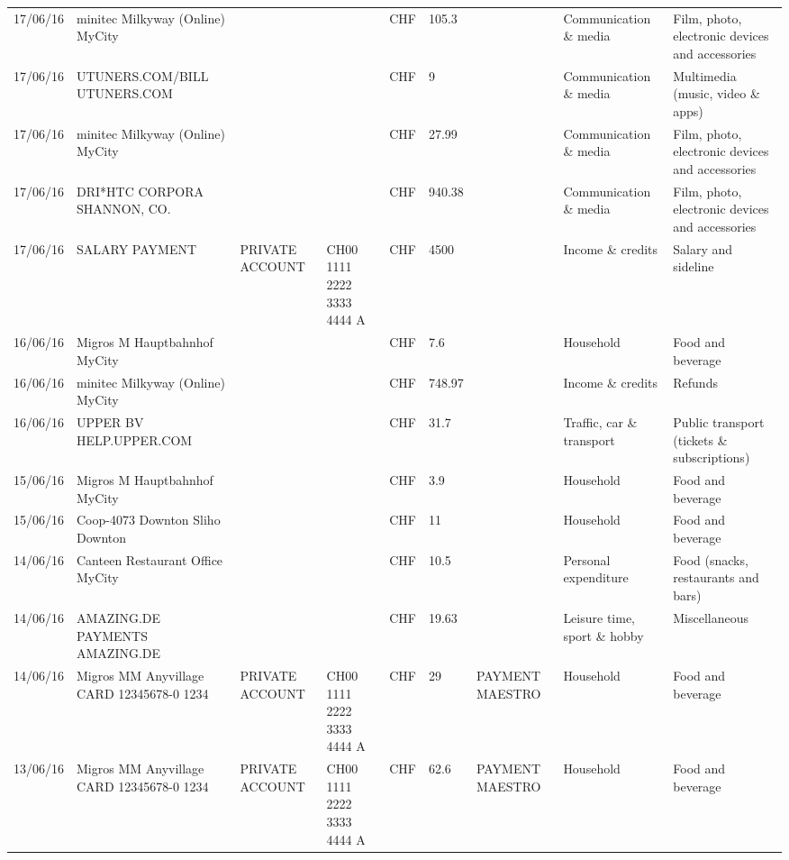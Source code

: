 \begin{landscape}
\begin{adjustwidth}{-2cm}{-2cm}
\begin{tiny}
\begin{longtable}{lp{4cm}llllp{3cm}ll}
		17/06/16 & minitec Milkyway (Online) MyCity &       &       & CHF   & 105.3 &       & Communication \& media & Film, photo, electronic devices and accessories \\
		17/06/16 & UTUNERS.COM/BILL          UTUNERS.COM &       &       & CHF   & 9     &       & Communication \& media & Multimedia (music, video \& apps) \\
		17/06/16 & minitec Milkyway (Online) MyCity &       &       & CHF   & 27.99 &       & Communication \& media & Film, photo, electronic devices and accessories \\
		17/06/16 & DRI*HTC CORPORA          SHANNON, CO. &       &       & CHF   & 940.38 &       & Communication \& media & Film, photo, electronic devices and accessories \\
		17/06/16 & SALARY PAYMENT & PRIVATE ACCOUNT & CH00 1111 2222 3333 4444 A & CHF   & 4500  &       & Income \& credits & Salary and sideline \\
		16/06/16 & Migros M Hauptbahnhof    MyCity &       &       & CHF   & 7.6   &       & Household & Food and beverage \\
		16/06/16 & minitec Milkyway (Online) MyCity &       &       & CHF   & 748.97 &       & Income \& credits & Refunds \\
		16/06/16 & UPPER BV                  HELP.UPPER.COM &       &       & CHF   & 31.7  &       & Traffic, car \& transport & Public transport (tickets \& subscriptions) \\
		15/06/16 & Migros M Hauptbahnhof    MyCity &       &       & CHF   & 3.9   &       & Household & Food and beverage \\
		15/06/16 & Coop-4073 Downton Sliho   Downton &       &       & CHF   & 11    &       & Household & Food and beverage \\
		14/06/16 & Canteen Restaurant Office      MyCity &       &       & CHF   & 10.5  &       & Personal expenditure & Food (snacks, restaurants and bars) \\
		14/06/16 & AMAZING.DE PAYMENTS       AMAZING.DE &       &       & CHF   & 19.63 &       & Leisure time, sport \& hobby & Miscellaneous \\
		14/06/16 & Migros MM Anyvillage CARD 12345678-0 1234 & PRIVATE ACCOUNT & CH00 1111 2222 3333 4444 A & CHF   & 29    & PAYMENT MAESTRO & Household & Food and beverage \\
		13/06/16 & Migros MM Anyvillage CARD 12345678-0 1234 & PRIVATE ACCOUNT & CH00 1111 2222 3333 4444 A & CHF   & 62.6  & PAYMENT MAESTRO & Household & Food and beverage \\

\end{longtable}
\end{tiny}
\end{adjustwidth}
\end{landscape}
